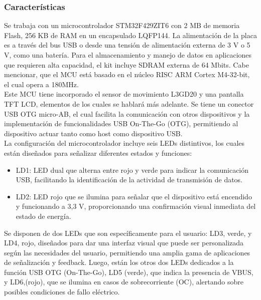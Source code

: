     \subsubsection{Características}

    Se trabaja con un microcontrolador STM32F429ZIT6 con 2 MB de memoria Flash, 256 KB de RAM en un encapsulado LQFP144. La alimentación de la placa es a través del bus USB o desde una tensión de alimentación externa de 3 V o 5 V, como una batería. Para el almacenamiento y manejo de datos en aplicaciones que requieren alta capacidad, el kit incluye SDRAM externa de 64 Mbits. Cabe mencionar, que el MCU está basado en el núcleo RISC ARM Cortex M4-32-bit, el cual opera a 180MHz. \cite{STM} \\

    Este MCU tiene incorporado el sensor de movimiento L3GD20 y una pantalla TFT LCD, elementos de los cuales se hablará más adelante. Se tiene un conector USB OTG micro-AB, el cual facilita la comunicación con otros dispositivos y la implementación de funcionalidades USB On-The-Go (OTG), permitiendo al dispositivo actuar tanto como host como dispositivo USB. \cite{STM} \\

    La configuración del microcontrolador incluye seis LEDs distintivos, los cuales están diseñados para señalizar diferentes estados y funciones: 
    \begin{itemize}
        \item LD1: LED dual que alterna entre rojo y verde para indicar la comunicación USB, facilitando la identificación de la actividad de transmisión de datos. \cite{STM} 
        \item LD2: LED rojo que se ilumina para señalar que el dispositivo está encendido y funcionando a 3,3 V, proporcionando una confirmación visual inmediata del estado de energía. \cite{STM}
    \end{itemize}
    
    Se disponen de dos LEDs que son específicamente para el usuario: LD3, verde, y LD4, rojo, diseñados para dar una interfaz visual que puede ser personalizada según las necesidades del usuario, permitiendo una amplia gama de aplicaciones de señalización y feedback. Luego, están los otros dos LEDs dedicados a la función USB OTG (On-The-Go), LD5 (verde), que indica la presencia de VBUS, y LD6,(rojo), que se ilumina en casos de sobrecorriente (OC), alertando sobre posibles condiciones de fallo eléctrico. \cite{STM} \\
    
